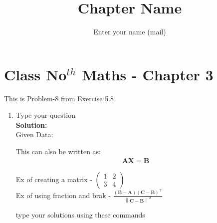 \documentclass[12pt]{article}
\title{Chapter Name}
\author{Enter your name (mail)}
\newcommand{\myvec}[1]{\ensuremath{\begin{pmatrix}#1\end{pmatrix}}}
\newcommand{\solution}{\noindent \textbf{Solution: }}
\providecommand{\brak}[1]{\ensuremath{\left(#1\right)}}
\providecommand{\norm}[1]{\left\lVert#1\right\rVert}
\let\vec\mathbf
\begin{document}
\maketitle
\section*{Class No$^{th}$ Maths - Chapter 3}
This is Problem-8 from Exercise 5.8
\begin{enumerate}
\item Type your question \\
\solution \\
Given Data:

This can also be written as:
\begin{align}
\vec{AX}=\vec{B}
\end{align}

Ex of creating a matrix - $\myvec{1&2\\3&4}$\\
Ex of using fraction and brak - $\frac{\brak{\vec{B}-\vec{A}}\brak{\vec{C}-\vec{B}}^{\top}}{\norm{\vec{C-B}}^2}$

type your solutions using these commands
	

\end{enumerate}
\end{document}

